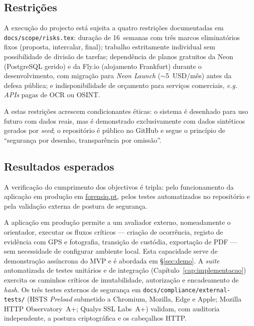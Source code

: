 \subsection{Restrições}
\label{sec:restricoes}

A execução do projecto está sujeita a quatro restrições documentadas
em \texttt{docs/scope/risks.tex}: duração de 16~semanas com três
marcos eliminatórios fixos (proposta, intercalar, final); trabalho
estritamente individual sem possibilidade de divisão de tarefas;
dependência de planos gratuitos da Neon (PostgreSQL gerido) e da
Fly.io (alojamento Frankfurt) durante o desenvolvimento, com migração
para \emph{Neon Launch} (\(\sim\)5~USD/mês) antes da defesa pública;
e indisponibilidade de orçamento para serviços comerciais,
\emph{e.g.} \emph{APIs} pagas de OCR ou OSINT.

A estas restrições acrescem condicionantes éticas: o sistema é
desenhado para uso futuro com dados reais, mas é demonstrado
exclusivamente com dados sintéticos gerados por \emph{seed}; o
repositório é público no GitHub e segue o princípio de
``segurança por desenho, transparência por omissão''.

\subsection{Resultados esperados}
\label{sec:resultados}

A verificação do cumprimento dos objectivos é tripla: pelo
funcionamento da aplicação em produção em
\href{https://forensiq.pt}{forensiq.pt}, pelos testes automatizados
no repositório e pela validação externa de postura de segurança.

A aplicação em produção permite a um avaliador externo,
nomeadamente o orientador, executar os fluxos críticos --- criação
de ocorrência, registo de evidência com GPS e fotografia,
transição de custódia, exportação de PDF --- sem necessidade de
configurar ambiente local. Esta capacidade serve de demonstração
assíncrona do MVP e é abordada em
\S\ref{sec:demo}. A \emph{suite} automatizada de testes
unitários e de integração (Capítulo~\ref{cap:implementacao})
exercita os caminhos críticos de imutabilidade, autorização e
encadeamento de \emph{hash}. Os três testes externos de segurança
em \texttt{docs/compliance/external-tests/} (HSTS \emph{Preload}
submetido a Chromium, Mozilla, Edge e Apple; Mozilla HTTP
Observatory~A+; Qualys SSL Labs~A+) validam, com auditoria
independente, a postura criptográfica e os cabeçalhos HTTP.

